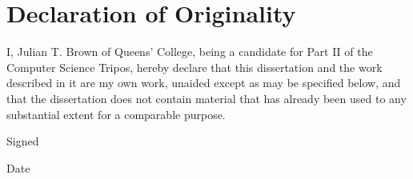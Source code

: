 \chapter*{Declaration of Originality}

I, Julian T. Brown of Queens' College, being a candidate for Part II of the Computer Science Tripos, hereby declare that this dissertation and the work described in it are my own work, unaided except as may be specified below, and that the dissertation does not contain material that has already been used to any substantial extent for a comparable purpose.

\vspace{5mm}

Signed

\vspace{5mm}

Date
